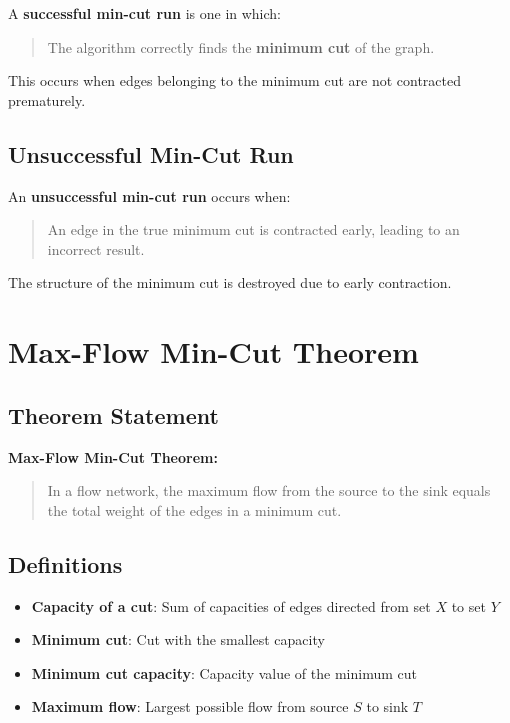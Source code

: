 \documentclass[11pt]{article}
\begin{document}
A \textbf{successful min-cut run} is one in which:

\begin{quote}
The algorithm correctly finds the \textbf{minimum cut} of the graph.
\end{quote}

\noindent
This occurs when edges belonging to the minimum cut are not contracted prematurely.

\subsection{Unsuccessful Min-Cut Run}

An \textbf{unsuccessful min-cut run} occurs when:

\begin{quote}
An edge in the true minimum cut is contracted early, leading to an incorrect result.
\end{quote}

\noindent
The structure of the minimum cut is destroyed due to early contraction.


\section{Max-Flow Min-Cut Theorem}

\subsection{Theorem Statement}

\textbf{Max-Flow Min-Cut Theorem:}

\begin{quote}
In a flow network, the maximum flow from the source to the sink equals the total weight of the edges in a minimum cut.
\end{quote}

\subsection{Definitions}

\begin{itemize}
    \item \textbf{Capacity of a cut}: Sum of capacities of edges directed from set $X$ to set $Y$
    \item \textbf{Minimum cut}: Cut with the smallest capacity
    \item \textbf{Minimum cut capacity}: Capacity value of the minimum cut
    \item \textbf{Maximum flow}: Largest possible flow from source $S$ to sink $T$
\end{itemize}
\end{document}
